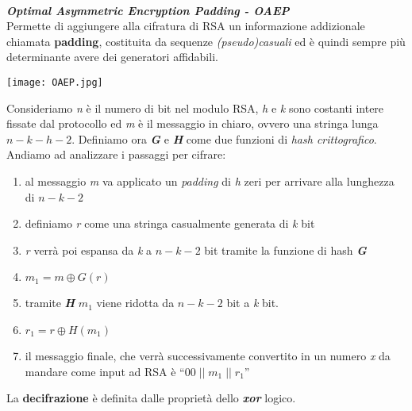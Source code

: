 \   \\
\textbf{\textit{Optimal Asymmetric Encryption Padding - OAEP}} \\
Permette di aggiungere alla cifratura di RSA un informazione addizionale chiamata \textbf{padding}, costituita da sequenze \textit{(pseudo)casuali} ed è quindi sempre più determinante avere dei generatori affidabili. \\ 
\begin{center}
    \texttt{[image: OAEP.jpg]}
\end{center}
Consideriamo \textit{n} è il numero di bit nel modulo RSA, \textit{h} e \textit{k} sono costanti intere fissate dal protocollo ed \textit{m} è il messaggio in chiaro, ovvero una stringa lunga $n - k - h - 2$. Definiamo ora \textbf{\textit{G}} e \textbf{\textit{H}} come due funzioni di \textit{hash crittografico}. Andiamo ad analizzare i passaggi per cifrare:
\begin{enumerate}
    \item al messaggio \textit{m} va applicato un \textit{padding} di \textit{h} zeri per arrivare alla lunghezza di $n - k - 2$
    \item definiamo \textit{r} come una stringa casualmente generata di \textit{k} bit
    \item \textit{r} verrà poi espansa da \textit{k} a $n - k - 2$ bit tramite la funzione di hash \textbf{\textit{G}}
    \item $m_1 = m \oplus G(r)$
    \item tramite \textbf{\textit{H}} $m_1$ viene ridotta da $n - k - 2$ bit a \textit{k} bit.
    \item $r_1 = r \oplus H(m_1)$
    \item il messaggio finale, che verrà successivamente convertito in un numero \textit{x} da mandare come input ad RSA è ``$00\;||\;m_1\;||\;r_1$''
\end{enumerate}
La \textbf{decifrazione} è definita dalle proprietà dello \textbf{\textit{xor}} logico.

\newpage
